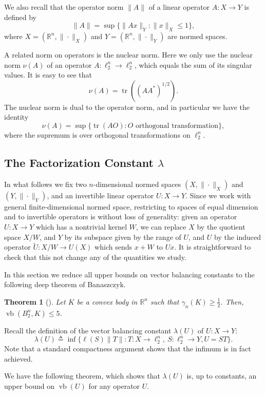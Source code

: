 \documentclass[11pt]{article}
\newtheorem{theorem}{Theorem}
\newcommand{\R}{{\mathbb{R}}}
\newcommand{\eqdef}{\triangleq}
\DeclareMathOperator{\vb}{vb}
\DeclareMathOperator{\tr}{tr}
\begin{document}
We also recall that the operator norm $\|A\|$ of a linear operator
$A:X \to Y$ is defined by 
\[
\|A\| = \sup\{\|Ax\|_Y: \|x\|_X \le 1\},
\]
where $X = (\R^n, \|\cdot\|_X)$ and $Y = (\R^n, \|\cdot\|_Y)$ are
normed spaces. 

A related norm on operators is the nuclear norm. Here we only use the
nuclear norm $\nu(A)$ of an operator $A:\ell_2^n \to \ell_2^n$, which
equals the sum of its singular values. It is easy to see that
\[
\nu(A) = \tr((AA^*)^{1/2}).
\]
The nuclear norm is dual to the operator norm, and in particular we
have the identity
\[
\nu(A) = \sup\{\tr(AO): O \text{ orthogonal transformation}\},
\]
where the supremum is over orthogonal transformations on $\ell_2^n$. 



\subsection{The Factorization Constant $\lambda$}

In what follows we fix two $n$-dimensional normed spaces $(X,
\|\cdot\|_X)$ and $(Y,\|\cdot\|_Y)$, and an invertible linear operator
$U:X \to Y$. Since we work with general finite-dimensional normed
space, restricting to spaces of equal dimension and to invertible
operators is without loss of generality: given an operator $U:X \to Y$
which has a nontrivial kernel $W$, we can replace $X$ by the
quotient space $X/W$, and $Y$ by its subspace given by the range of
$U$, and $U$ by the induced operator $\tilde{U}:X/W \to U(X)$ which
sends $x+W$ to $Ux$. It is straightforward to check that this not
change any of the quantities we study.

In this section we reduce all upper bounds on vector balancing
constants to the following deep theorem of Banaszczyk.
\begin{theorem}[\cite{bana}]\label{thm:bana}
  Let $K$ be a convex body in $\R^n$ such that $\gamma_n(K) \ge
  \frac12$. Then, $\vb(B_2^n, K) \le 5$.
\end{theorem}

Recall the definition of the vector balancing constant $\lambda(U)$ of
$U:X \to Y$: 
\[
\lambda(U) \eqdef \inf \{\ell(S)\|T\|: T: X \to \ell_2^n,\ S: \ell_2^n
\to Y, U = ST\}.
\]
Note that a standard compactness argument shows that the infimum is in fact achieved. 

We have the following theorem, which shows that $\lambda(U)$ is, up to
constants, an upper bound on $\vb(U)$ for any operator $U$. 
\end{document}
